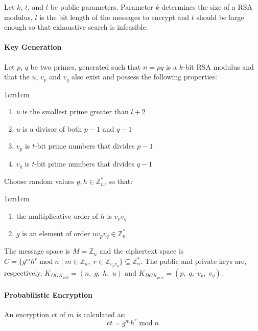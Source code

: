 \begin{definition}\label{ch3:definition:dgk} Let $k$, $t$, and $l$ be public parameters. Parameter $k$ determines the size of a \gls{RSA} modulus, $l$ is the bit length of the messages to encrypt and $t$ should be large enough so that exhaustive search is infeasible.


    \paragraph{Key Generation} Let $p$, $q$ be two primes, generated such that $n = pq$ is a $k$-bit \gls{RSA} modulus and that the $u$, $v_p$ and $v_q$ also exist and possess the following properties:

    \begin{changemargin}{1cm}{1cm}
        \begin{enumerate}
            \item $u$ is the smallest prime greater than $l + 2$
            \item $u$ is a divisor of both $p - 1$ and $q -1$
            \item $v_p$ is $t$-bit prime numbers that divides $p - 1$
            \item $v_q$ is $t$-bit prime numbers that divides $q - 1$
        \end{enumerate}
    \end{changemargin}


    Choose random values $g, h \in \mathbb{Z}^*_n$, so that:

    \begin{changemargin}{1cm}{1cm}
        \begin{enumerate}
            \item the multiplicative order of $h$ is $v_pv_q$
            \item $g$ is an element of order $uv_pv_q \in \mathbb{Z}^*_n$
        \end{enumerate}
    \end{changemargin}

    The message space is $M = \mathbb{Z}_u$ and the ciphertext space is $C = \{g^mh^r \; \textrm{mod} \; n \; | \; m \in \mathbb{Z}_u, \;  r \in \mathbb{Z}_{v_pv_q}\} \subseteq \mathbb{Z}^*_n$. The public and private keys are, respectively, $K_{DGK_{pub}} = (n,\;g,\;h,\;u)$ and $K_{DGK_{priv}} = (p,\;q,\;v_p,\;v_q)$.

    \paragraph{Probabilistic Encryption} An encryption $ct$ of $m$ is calculated as:
    \begin{equation}\label{chapter3:definition:dgk:equation:rnd-enc}
        ct = g^mh^r  \; \textrm{mod} \; n
    \end{equation}


\end{definition}
